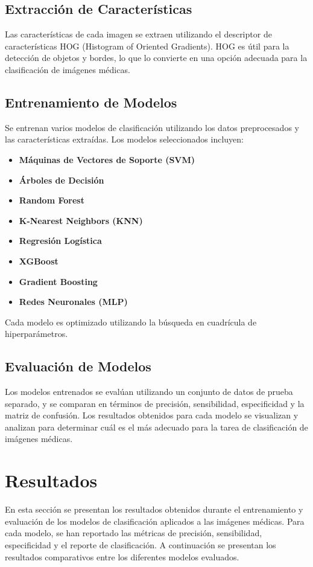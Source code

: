 \documentclass[12pt]{article}
\begin{document}
\subsection{Extracción de Características}
Las características de cada imagen se extraen utilizando el descriptor de características HOG (Histogram of Oriented Gradients)\cite{dalal2005histograms}. HOG es útil para la detección de objetos y bordes, lo que lo convierte en una opción adecuada para la clasificación de imágenes médicas.

\subsection{Entrenamiento de Modelos}
Se entrenan varios modelos de clasificación utilizando los datos preprocesados y las características extraídas. Los modelos seleccionados incluyen:
\begin{itemize}
    \item \textbf{Máquinas de Vectores de Soporte (SVM)}\cite{cortes1995support}
    \item \textbf{Árboles de Decisión}\cite{quinlan1986induction}
    \item \textbf{Random Forest}\cite{breiman2001random}
    \item \textbf{K-Nearest Neighbors (KNN)}\cite{cover1967nearest}
    \item \textbf{Regresión Logística}\cite{cox1958regression}
    \item \textbf{XGBoost}\cite{chen2016xgboost}
    \item \textbf{Gradient Boosting}\cite{friedman2001greedy}
    \item \textbf{Redes Neuronales (MLP)}\cite{rumelhart1986learning}
\end{itemize}
Cada modelo es optimizado utilizando la búsqueda en cuadrícula de hiperparámetros.

\subsection{Evaluación de Modelos}
Los modelos entrenados se evalúan utilizando un conjunto de datos de prueba separado, y se comparan en términos de precisión, sensibilidad, especificidad y la matriz de confusión. Los resultados obtenidos para cada modelo se visualizan y analizan para determinar cuál es el más adecuado para la tarea de clasificación de imágenes médicas.


\section{Resultados}
En esta sección se presentan los resultados obtenidos durante el entrenamiento y evaluación de los modelos de clasificación aplicados a las imágenes médicas. Para cada modelo, se han reportado las métricas de precisión, sensibilidad, especificidad y el reporte de clasificación. A continuación se presentan los resultados comparativos entre los diferentes modelos evaluados.
\end{document}
